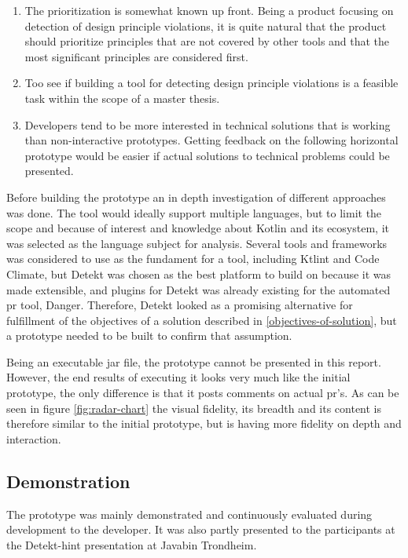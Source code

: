 \documentclass{report}
\begin{document}
\begin{enumerate}
    \item The prioritization is somewhat known up front. Being a product focusing on detection of design principle violations, it is quite natural that the product should prioritize principles that are not covered by other tools and that the most significant principles are considered first.
    \item Too see if building a tool for detecting design principle violations is a feasible task within the scope of a master thesis.
    \item Developers tend to be more interested in technical solutions that is working than non-interactive prototypes. Getting feedback on the following horizontal prototype would be easier if actual solutions to technical problems could be presented.
\end{enumerate}

Before building the prototype an in depth investigation of different approaches was done. The tool would ideally support multiple languages, but to limit the scope and because of interest and knowledge about Kotlin and its ecosystem, it was selected as the language subject for analysis. Several tools and frameworks was considered to use as the fundament for a tool, including Ktlint\cite{ktlint} and Code Climate\cite{codeclimate}, but Detekt\cite{detekt} was chosen as the best platform to build on because it was made extensible, and plugins for Detekt was already existing for the automated \gls{pr} tool\cite{danger-detekt-plugin}, Danger\cite{danger}. Therefore, Detekt looked as a promising alternative for fulfillment of the objectives of a solution described in \ref{objectives-of-solution}, but a prototype needed to be built to confirm that assumption. 

Being an executable jar file, the prototype cannot be presented in this report. However, the end results of executing it looks very much like the initial prototype, the only difference is that it posts comments on actual \gls{pr}'s. As can be seen in figure \ref{fig:radar-chart} the visual fidelity, its breadth and its content is therefore similar to the initial prototype, but is having more fidelity on depth and interaction.  

\subsection*{Demonstration}
The prototype was mainly demonstrated and continuously evaluated during development to the developer. It was also partly presented to the participants at the Detekt-hint presentation at Javabin Trondheim.
\end{document}
